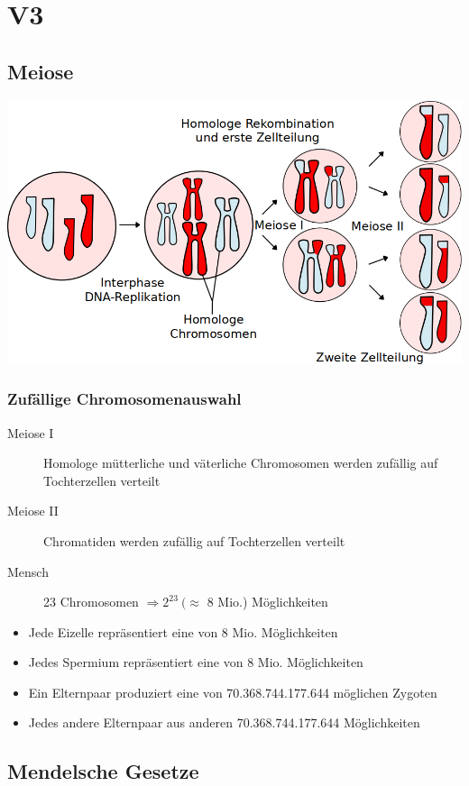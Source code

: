 \section{V3}
\subsection{Meiose}

\includegraphics[width=1\textwidth]{lectures/V3/pix/Meiosis_Overview_new.png}

\subsubsection{Zufällige Chromosomenauswahl}
\begin{description}
    \item[Meiose I] Homologe mütterliche und väterliche Chromosomen werden zufällig auf Tochterzellen verteilt
    \item[Meiose II] Chromatiden werden zufällig auf Tochterzellen verteilt
    \item[Mensch] 23 Chromosomen $\Rightarrow 2^{23}~(\approx$ 8 Mio.) Möglichkeiten
\end{description}
\begin{itemize}
    \item Jede Eizelle repräsentiert eine von 8 Mio. Möglichkeiten
    \item Jedes Spermium repräsentiert eine von 8 Mio. Möglichkeiten
    \item Ein Elternpaar produziert eine von 70.368.744.177.644 möglichen Zygoten
    \item Jedes andere Elternpaar aus anderen 70.368.744.177.644 Möglichkeiten
\end{itemize}

\subsection{Mendelsche Gesetze}
